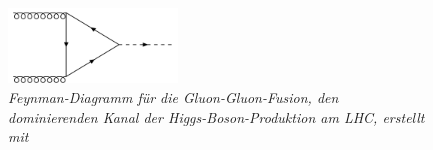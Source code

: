  \begin{figure}[hhh]
  \begin{center}
    \includegraphics[width=0.4\textwidth]{graphics/gluonfusion.png}
    \parbox[b]{12cm}{
      \caption[Gluon-Gluon-Fusion Feynman-Diagramm]
             {\label{fig:gluonfusion} \it\!Feynman-Diagramm f\"ur die Gluon-Gluon-Fusion, den dominierenden Kanal der Higgs-Boson-Produktion am LHC, erstellt mit \cite{feynman_draw}}
    }
  \end{center}
 \end{figure}